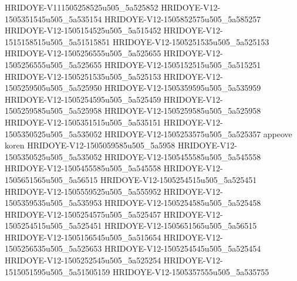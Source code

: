 HRIDOYE-V111505258525u505_5a525852
HRIDOYE-V12-1505351545u505_5a535154
HRIDOYE-V12-1505852575u505_5a585257 
HRIDOYE-V12-1505154525u505_5a515452
HRIDOYE-V12-1515158515u505_5a51515851
HRIDOYE-V12-1505251535u505_5a525153
HRIDOYE-V12-1505256555u505_5a525655
HRIDOYE-V12-1505256555u505_5a525655
HRIDOYE-V12-1505152515u505_5a515251
HRIDOYE-V12-1505251535u505_5a525153
HRIDOYE-V12-1505259505u505_5a525950
HRIDOYE-V12-1505359595u505_5a535959
HRIDOYE-V12-1505254595u505_5a525459
HRIDOYE-V12-1505259585u505_5a525958
HRIDOYE-V12-1505259585u505_5a525958
HRIDOYE-V12-1505351515u505_5a535151
HRIDOYE-V12-1505350525u505_5a535052
HRIDOYE-V12-1505253575u505_5a525357
appeove koren
HRIDOYE-V12-1505059585u505_5a5958
HRIDOYE-V12-1505350525u505_5a535052
HRIDOYE-V12-1505455585u505_5a545558
HRIDOYE-V12-1505455585u505_5a545558
HRIDOYE-V12-1505651565u505_5a56515
HRIDOYE-V12-1505254515u505_5a525451
HRIDOYE-V12-1505559525u505_5a555952
HRIDOYE-V12-1505359535u505_5a535953
HRIDOYE-V12-1505254585u505_5a525458
HRIDOYE-V12-1505254575u505_5a525457
HRIDOYE-V12-1505254515u505_5a525451
HRIDOYE-V12-1505651565u505_5a56515
HRIDOYE-V12-1505156545u505_5a515654
HRIDOYE-V12-1505256535u505_5a525653
HRIDOYE-V12-1505254545u505_5a525454
HRIDOYE-V12-1505252545u505_5a525254
HRIDOYE-V12-1515051595u505_5a51505159
HRIDOYE-V12-1505357555u505_5a535755
